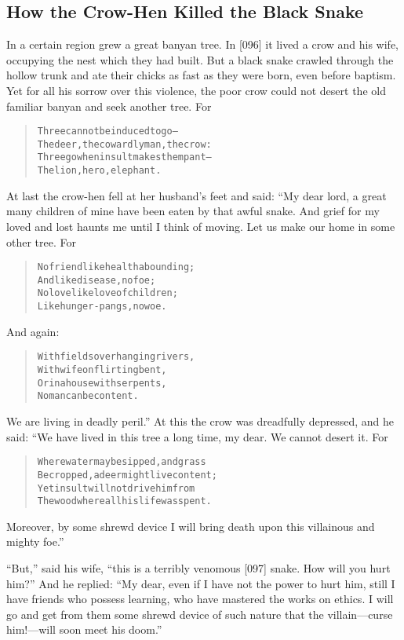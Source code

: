 \documentclass[article, twoside, 14pt]{memoir}
\renewenvironment{verbatim}{%
\begin{quote}%
\vskip -10pt%
\begin{alltt}\normalfont\large}{\end{alltt}%
\end{quote}%
\vskip -10pt
} %
\begin{document}
\subsection{How the Crow-Hen Killed the Black Snake}

\label{s8}

In a certain region grew a great banyan tree. In [096] it lived a
crow and his wife, occupying the nest which they had built. But a
black snake crawled through the hollow trunk and ate their chicks
as fast as they were born, even before baptism. Yet for all his
sorrow over this violence, the poor crow could not desert the old
familiar banyan and seek another tree. For

\begin{verbatim}
Three cannot be induced to go--
The deer, the cowardly man, the crow:
Three go when insult makes them pant--
The lion, hero, elephant.
\end{verbatim}
At last the crow-hen fell at her husband's feet and said: “My dear
lord, a great many children of mine have been eaten by that awful
snake. And grief for my loved and lost haunts me until I think of
moving. Let us make our home in some other tree. For

\begin{verbatim}
No friend like health abounding;
    And like disease, no foe;
No love like love of children;
    Like hunger-pangs, no woe.
\end{verbatim}
And again:

\begin{verbatim}
With fields overhanging rivers,
    With wife on flirting bent,
Or in a house with serpents,
    No man can be content.
\end{verbatim}
We are living in deadly peril.” At this the crow was dreadfully
depressed, and he said: “We have lived in this tree a long time, my
dear. We cannot desert it. For

\begin{verbatim}
Where water may be sipped, and grass
    Be cropped, a deer might live content;
Yet insult will not drive him from
    The wood where all his life was spent.
\end{verbatim}
Moreover, by some shrewd device I will bring death upon this
villainous and mighty foe.”

``But,'' said his wife,
``this is a terribly venomous [097] snake. How will you hurt him?''
And he replied:
``My dear, even if I have not the power to hurt him, still I have friends who possess learning, who have mastered the works on ethics. I will go and get from them some shrewd device of such nature that the villain---curse him!---will soon meet his doom.''
\end{document}
